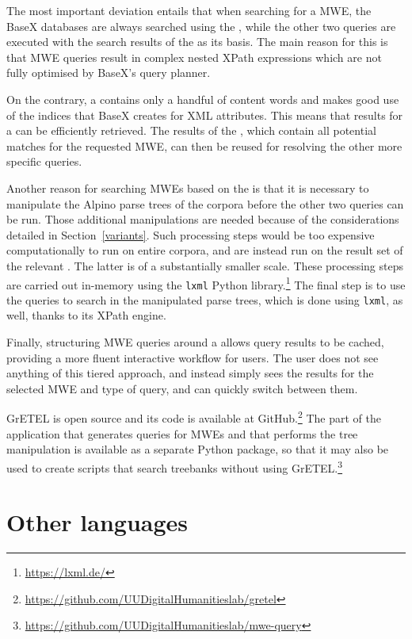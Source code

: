 \documentclass[output=paper,colorlinks,citecolor=brown]{langscibook}
\begin{document}
The most important deviation entails that when searching for a MWE, the BaseX databases are always searched using the {\supersetquery}, while the other two queries are executed with the search results of the {\supersetquery} as its basis. The main reason for this is that MWE queries result in complex nested XPath expressions which are not fully optimised by BaseX's query planner.

On the contrary, a {\supersetquery} contains only a handful of content words and makes good use of the indices that BaseX creates for XML attributes. This means that results for a {\supersetquery} can be efficiently retrieved. The results of the {\supersetquery}, which contain all potential matches for the requested MWE, can then be reused for resolving the other more specific queries.

Another reason for searching MWEs based on the {\supersetquery} is that it is necessary to manipulate the Alpino parse trees of the corpora before the other two queries can be run. Those additional manipulations are needed because of the considerations detailed in Section~\ref{variants}. Such processing steps would be too expensive computationally to run on entire corpora, and are instead run on the result set of the relevant {\supersetquery}. The latter is of a substantially smaller scale. These processing steps are carried out in-memory using the \texttt{lxml} Python library.\footnote{\url{https://lxml.de/}}
The final step is to use the queries to search in the manipulated parse trees, which is done using \texttt{lxml}, as well, thanks to its XPath engine.\largerpage


Finally, structuring MWE queries around a {\supersetquery} allows query results to be cached, providing a more fluent interactive workflow for users. The user does not see anything of this tiered approach, and instead simply sees the results for the selected MWE and type of query, and can quickly switch between them.

GrETEL is open source and its code is available at GitHub.\footnote{\url{https://github.com/UUDigitalHumanitieslab/gretel}} The part of the application that generates queries for MWEs and that performs the tree manipulation is available as a separate Python package, so that it may also be used to create scripts that search treebanks without using GrETEL.\footnote{\url{https://github.com/UUDigitalHumanitieslab/mwe-query}} 

\section{Other languages}
\label{otherlanguages}
\end{document}
